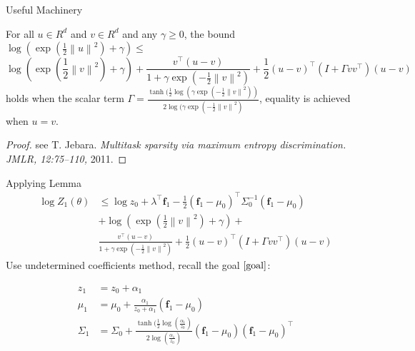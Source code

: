 \documentclass{beamer}
\begin{document}
\begin{frame}{Useful Machinery}
  \begin{lemma}
    For all $u\in R^d$ and $v\in R^d$ and any $\gamma \geq 0$, the bound $\log(\exp(\frac{1}{2}\left\lVert u \right\lVert^2) + \gamma) \leq $
    \begin{equation}
      \log(\exp(\frac{1}{2}\left\lVert v \right\lVert^2) + \gamma) + \frac{ v^{\top} (u- v)}{1 + \gamma \exp(-\frac{1}{2}\left\lVert v \right\lVert^2)} + \frac{1}{2}(u-v)^{\top} (I + \Gamma vv^{\top})(u-v)         \nonumber
    \end{equation}
    holds when the scalar term $\Gamma = \frac{\tanh(\frac{1}{2}\log(\gamma \exp(-\frac{1}{2}\left\lVert v \right\lVert^2))}{2\log(\gamma \exp(-\frac{1}{2}\left\lVert v \right\lVert^2)}$, equality is achieved when $u = v$.
   \label{lemma1}
  \end{lemma}
  \begin{proof}
    see T. Jebara. {\it Multitask sparsity via maximum entropy discrimination. JMLR, 12:75–110,} 2011.
  \end{proof}
\end{frame}


\begin{frame}{Applying Lemma}
  \begin{equation}
    \begin{aligned}
     \log Z_1(\theta) & \leq \log z_0 + \lambda^{\top}\textbf{f}_1 - \frac{1}{2} (\textbf{f}_1 - \mu_0)^{\top} \Sigma_0^{-1} (\textbf{f}_1 - \mu_0) \\
            & + \log(\exp(\frac{1}{2}\left\lVert v \right\lVert^2) + \gamma) +  \\ &\frac{ v^{\top} (u- v)}{1 + \gamma \exp(-\frac{1}{2}\left\lVert v \right\lVert^2)} + \frac{1}{2}(u-v)^{\top} (I + \Gamma vv^{\top})(u-v)         \nonumber
         \label{inequality5}
    \end{aligned}
  \end{equation}
Use undetermined coefficients method, recall the goal $\ref{goal}$:

\begin{equation}
  \begin{aligned}
    z_1 &= z_0 + \alpha_1 \\ \nonumber 
    \mu_1 &=  \mu_0 + \frac{\alpha_1}{z_0 + \alpha_1} (\textbf{f}_1 - \mu_0) \\
    \Sigma_1 &= \Sigma_0 + \frac{\tanh(\frac{1}{2}\log(\frac{\alpha_1}{z_0})}{2\log(\frac{\alpha_1}{z_0})} (\textbf{f}_1 - \mu_0)(\textbf{f}_1 - \mu_0)^{\top}
     \end{aligned}
 \end{equation} 


\end{frame}
\end{document}
